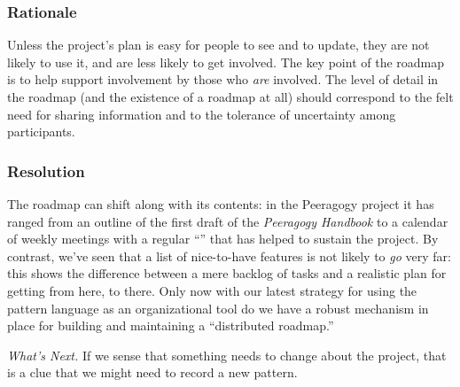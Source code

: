 \subsubsection*{Rationale} Unless the project's plan is easy for people to see and to update, they are not likely to use it, and are less likely to get involved.  The key point of the roadmap is to help support involvement by those who \emph{are} involved.   The level of detail in the roadmap (and the existence of a roadmap at all) should correspond to the felt need for sharing information and to the tolerance of uncertainty among participants.

\subsubsection*{Resolution}
The roadmap can shift along with its contents: in the Peeragogy project it has ranged from an outline of the first draft of the \emph{Peeragogy Handbook} to a calendar of weekly meetings with a regular ``'' that has helped to sustain the project.  By contrast, we've seen that a list of nice-to-have features is not likely to \emph{go} very far: this shows the difference between a mere backlog of tasks and a realistic plan for getting from here, to there.  Only now with our latest strategy for using the pattern language as an organizational tool do we have a robust mechanism in place for building and maintaining a ``distributed roadmap.''

\begin{framed}
\emph{What's Next.}
If we sense that something needs to change about the project, that is a clue that we might need to record a new pattern.
\end{framed}

\endgroup
    
    
    
    
    
    
    